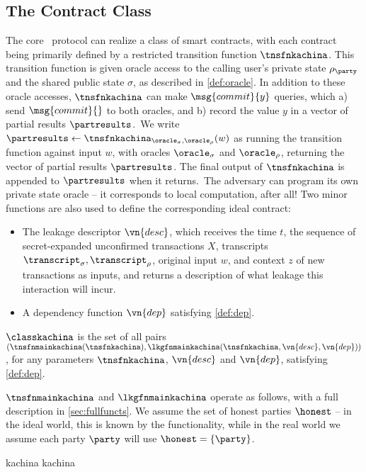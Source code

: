 \subsection{The Contract Class}
\label{sec:classkachina}

The core \kachina\ protocol can realize a class of smart contracts, with each
contract being primarily defined by a restricted transition function
$\tnsfnkachina$. This transition function is given oracle access to the calling
user's private state $\rho_\party$ and the shared public state $\sigma$, as
described in \autoref{def:oracle}. In addition to these oracle accesses,
  $\tnsfnkachina$ can make $\msg{commit}{y}$ queries, which a) send
  $\msg{commit}{}$ to both oracles, and b) record the value $y$ in a vector of
  partial results $\partresults$.\ We write $\partresults \gets
  \tnsfnkachina_{\oracle_\sigma, \oracle_\rho}(w)$ as running the transition
  function against input $w$, with oracles $\oracle_\sigma$ and $\oracle_\rho$,
  returning the vector of partial results $\partresults$. The final output of
  $\tnsfnkachina$ is appended to $\partresults$ when it returns.\ The adversary
can program its own private state oracle -- it corresponds to local computation,
after all! Two minor functions are also used to define the corresponding ideal
contract:
\begin{itemize}
  \item The leakage descriptor $\vn{desc}$, which receives the time $t$, the
    sequence of secret-expanded unconfirmed transactions $X$, transcripts
    $\transcript_\sigma, \transcript_\rho$, original input $w$, and context $z$
    of new transactions as inputs, and returns a description of what leakage this
    interaction will incur.
  \item A dependency function $\vn{dep}$ satisfying \autoref{def:dep}.
\end{itemize}

\begin{definition}
  $\classkachina$ is the set of all pairs $(\tnsfnmainkachina(\tnsfnkachina),\allowbreak
  \lkgfnmainkachina(\tnsfnkachina, \vn{desc},\allowbreak \vn{dep}))$, for any
  parameters $\tnsfnkachina$, $\vn{desc}$ and $\vn{dep}$, satisfying
  \autoref{def:dep}.
\end{definition}

\noindent $\tnsfnmainkachina$ and $\lkgfnmainkachina$ operate as
follows, with a full description in
\iffull\autoref{sec:fullfuncts}\else\cite[Appendix~C]{fullversion}\fi. We assume the set of honest parties $\honest$ -- in
the ideal world, this is known by the functionality, while in the real world we
assume each party $\party$ will use $\honest = \{\party\}$.

{kachina}
{kachina}

